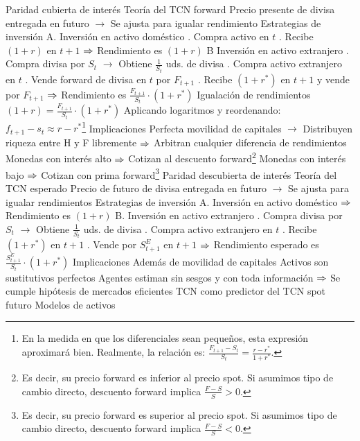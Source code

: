 \documentclass{nuevotema}
\begin{document}
\begin{esquemal}
			\3 Paridad cubierta de interés
				\4 Teoría del TCN forward
				\4[] Precio presente de divisa entregada en futuro
				\4[] $\to$ Se ajusta para igualar rendimiento
				\4 Estrategias de inversión
				\4[] A. Inversión en activo doméstico
				. Compra activo en $t$
				. Recibe $(1+r)$ en $t+1$
				\4[] $\Rightarrow$ Rendimiento es $(1+r)$
				\4[] B Inversión en activo extranjero
				. Compra divisa por $S_t$
				\4[] $\to$ Obtiene $\frac{1}{S_t}$ uds. de divisa
				. Compra activo extranjero en $t$
				. Vende forward de divisa en $t$ por $F_{t+1}$
				. Recibe $(1+r^*)$ en $t+1$ y vende por $F_{t+1}$
				\4[] $\Rightarrow$ Rendimiento es $\frac{F_{t+1}}{S_t} \cdot (1+r^*)$
				\4 Igualación de rendimientos
				\4[] $(1+r) = \frac{F_{t+1}}{S_t} \cdot (1+r^*)$
				\4[] Aplicando logaritmos y reordenando:
				\4[] $f_{t+1} - s_t \approx r - r^*$\footnote{En la medida en que los diferenciales sean pequeños, esta expresión aproximará bien. Realmente, la relación es: $\frac{F_{t+1} - S_t}{S_t} = \frac{r- r^*}{1+r^*}$.}
				\4 Implicaciones
				\4[] Perfecta movilidad de capitales
				\4[] $\to$ Distribuyen riqueza entre H y F libremente
				\4[] $\Rightarrow$ Arbitran cualquier diferencia de rendimientos
				\4[] Monedas con interés alto
				\4[] $\Rightarrow$ Cotizan al descuento forward\footnote{Es decir, su precio forward es inferior al precio spot. Si asumimos tipo de cambio directo, descuento forward implica $\frac{F-S}{S} >0$.}
				\4[] Monedas con interés bajo
				\4[] $\Rightarrow$ Cotizan con prima forward\footnote{Es decir, su precio forward es superior al precio spot. Si asumimos tipo de cambio directo, descuento forward implica $\frac{F-S}{S} < 0$.}
			\3 Paridad descubierta de interés
				\4 Teoría del TCN esperado
				\4[] Precio de futuro de divisa entregada en futuro
				\4[] $\to$ Se ajusta para igualar rendimientos
				\4 Estrategias de inversión
				\4[] A. Inversión en activo doméstico
				\4[] $\Rightarrow$ Rendimiento es $(1+r)$
				\4[] B. Inversión en activo extranjero
				. Compra divisa por $S_t$
				\4[] $\to$ Obtiene $\frac{1}{S_t}$ uds. de divisa
				. Compra activo extranjero en $t$
				. Recibe $(1+r^*)$ en $t+1$
				. Vende por $S^E_{t+1}$ en $t+1$
				\4[] $\Rightarrow$ Rendimiento esperado es $\frac{S_{t+1}^E}{S_t} \cdot (1+r^*)$
				\4 Implicaciones
				\4[] Además de movilidad de capitales
				\4[] Activos son sustitutivos perfectos
				\4[] Agentes estiman sin sesgos y con toda información
				\4[] $\Rightarrow$ Se cumple hipótesis de mercados eficientes
			\3 TCN como predictor del TCN spot futuro
		\2 Modelos de activos

\end{esquemal}
\end{document}
